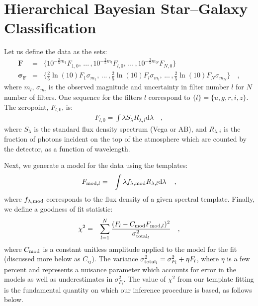 \documentclass[12pt,preprint]{aastex}
\newcommand{\datavector}[1]{\boldsymbol{#1}}
\newcommand{\flux}{\datavector{F}}
\newcommand{\uncertainty}{\datavector{\sigma_F}}
\newcommand{\dd}{\mathrm{d}}
\begin{document}
\appendix
\section{Hierarchical Bayesian Star--Galaxy Classification}

Let us define the data as the sets:
\footnotesize
\begin{eqnarray}\displaystyle
\flux & = & \{10^{-\frac{2}{5}m_1}F_{1,0},\,...\,,10^{-\frac{2}{5}m_l}F_{l,0},\,...\,,10^{-\frac{2}{5}m_N}F_{N,0}\}
\nonumber\\
\uncertainty & = & \{\frac{2}{5}\ln(10)F_1\sigma_{m_1},\,...\,,\frac{2}{5}\ln(10)F_l\sigma_{m_l},\,...\,,\frac{2}{5}\ln(10)F_N\sigma_{m_N}\}
\quad ,
\end{eqnarray}
\normalsize
\noindent where $m_l$, $\sigma_{m_l}$ is the observed magnitude and 
uncertainty in filter number $l$ for $N$ number of filters.  One  
sequence for the filters $l$ correspond to $\{l\}=\{u,g,r,i,z\}$. The 
zeropoint, $F_{l,0}$, is:
\begin{eqnarray}\displaystyle
F_{l,0}=\int \lambda S_\lambda R_{\lambda, l} \dd \lambda
\quad ,
\end{eqnarray}
where $S_\lambda$ is the standard flux density spectrum (Vega or AB), and 
$R_{\lambda,i}$ is the fraction of photons incident on the top 
of the atmosphere which are counted by the detector, as a function 
of wavelength.

Next, we generate a model for the data using the templates:
\begin{eqnarray}\displaystyle
F_{{\rm mod},l} & = & \int  \lambda f_{\lambda,{\rm mod}} R_{\lambda,l} {\rm d}\lambda\,
\quad ,
\end{eqnarray}
where $f_{\lambda,{\rm mod}}$ corresponds to the flux density 
of a given spectral template.  Finally, we define a goodness of 
fit statistic:
\begin{eqnarray}\displaystyle\label{eqn:chi}
\chi^2 & = & \sum\limits_{l=1}^N \frac{(F_l-C_{\rm mod}F_{{\rm mod},l})^2}{\sigma_{{\rm total}_l}^2}
\quad ,
\end{eqnarray}
where $C_{\rm mod}$ is a constant unitless amplitude applied to the 
model for the fit (discussed more below as $C_{ij}$).  The variance 
$\sigma_{{\rm total}_l}^2 = \sigma_{F_l}^2 + \eta F_{l}$, where $\eta$ is 
a few percent and represents a nuisance parameter which accounts for 
error in the models as well as underestimates in $ \sigma_{F_l}^2 $.  The 
value of $\chi^2$ from our template fitting is the fundamental quantity 
on which our inference procedure is based, as follows below.
\end{document}
